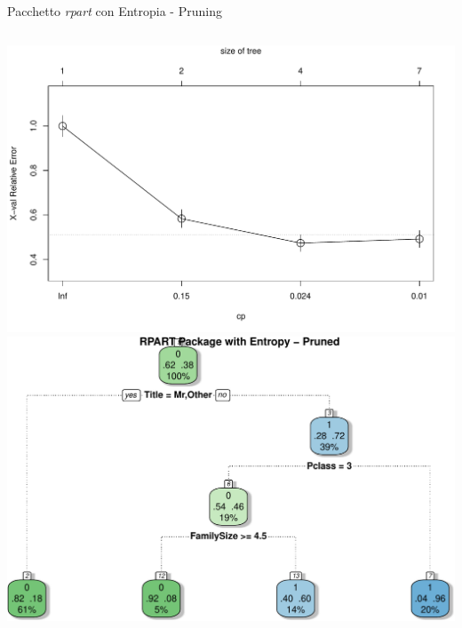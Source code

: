 \documentclass[9pt, xcolor=table]{beamer}
\begin{document}
	\begin{frame}{Pacchetto \textit{rpart} con Entropia - Pruning}
		
		
		\vfill
		
		\begin{columns}
			\centering
			\includegraphics[scale=0.26]{rpart-entropy-size-plot}
			\centering
			\includegraphics[scale=0.28]{rpart-entropy-pruned}
		\end{columns}	
	\end{frame}

	\fi
\end{document}
